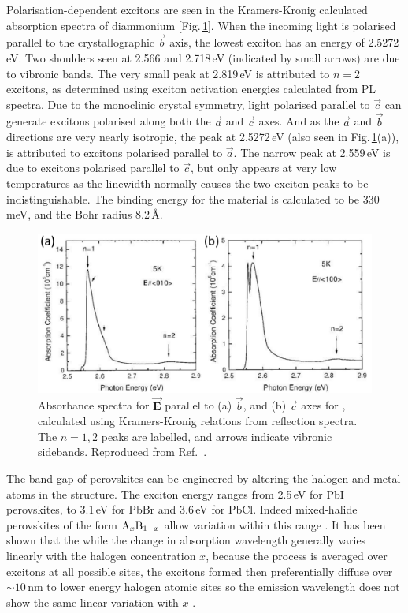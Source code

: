 Polarisation-dependent excitons are seen in the Kramers-Kronig calculated absorption spectra of diammonium  [Fig.\,\ref{2Fig14}]. When the incoming light is polarised parallel to the crystallographic $\vec{b}$ axis, the lowest exciton has an energy of 2.5272\,eV. Two shoulders seen at 2.566 and 2.718\,eV (indicated by small arrows) are due to vibronic bands. The very small peak at 2.819\,eV is attributed to $n=2$ excitons, as determined using exciton activation energies calculated from PL spectra. Due to the monoclinic crystal symmetry, light polarised parallel to $\vec{c}$ can generate excitons polarised along both the $\vec{a}$ and $\vec{c}$ axes. And as the $\vec{a}$ and $\vec{b}$ directions are very nearly isotropic, the peak at 2.5272\,eV (also seen in Fig.\,\ref{2Fig14}(a)), is attributed to excitons polarised parallel to $\vec{a}$. The narrow peak at 2.559\,eV is due to excitons polarised parallel to $\vec{c}$, but only appears at very low temperatures as the linewidth normally causes the two exciton peaks to be indistinguishable. The binding energy for the material is calculated to be 330\,meV, and the Bohr radius 8.2\,\AA \cite{Goto2001}.
\begin{figure} [h!]
\centering
\includegraphics[width=\textwidth]{Fig14}
\caption{Absorbance spectra for $\vec{\mathbf{E}}$ parallel to (a) $\vec{b}$, and (b) $\vec{c}$ axes for , calculated using Kramers-Kronig relations from reflection spectra. The $n=1, 2$ peaks are labelled, and arrows indicate vibronic sidebands. Reproduced from Ref.\ \cite{Goto2001}.}
\label{2Fig14}
\end{figure}

The band gap of perovskites can be engineered by altering the halogen and metal atoms in the structure. The exciton energy ranges from 2.5\,eV for PbI perovskites, to 3.1\,eV for PbBr and 3.6\,eV for PbCl. Indeed mixed-halide perovskites of the form $\textnormal{A}_x\textnormal{B}_{1-x}$ allow variation within this range \cite{Kitazawa1996, Kitazawa1997}. It has been shown that the while the change in absorption wavelength generally varies linearly with the halogen concentration $x$, because the process is averaged over excitons at all possible sites, the excitons formed then preferentially diffuse over $\sim10$\,nm to lower energy halogen atomic sites so the emission wavelength does not show the same linear variation with $x$ \cite{Ahmad2013}.


